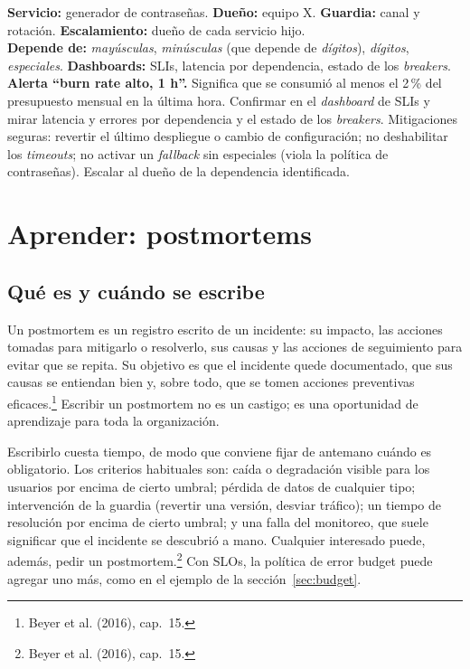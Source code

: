\documentclass[variant=apuntes,cover=institutional,mode=screen]{ua-engineering-v6-article}
\begin{document}
\begin{uainfo}
\textbf{Servicio:} generador de contraseñas. \textbf{Dueño:} equipo X. \textbf{Guardia:} canal y rotación. \textbf{Escalamiento:} dueño de cada servicio hijo.\\[2pt]
\textbf{Depende de:} \emph{mayúsculas}, \emph{minúsculas} (que depende de \emph{dígitos}), \emph{dígitos}, \emph{especiales}. \textbf{Dashboards:} SLIs, latencia por dependencia, estado de los \emph{breakers}.\\[2pt]
\textbf{Alerta ``burn rate alto, 1 h''.} Significa que se consumió al menos el 2\,\% del presupuesto mensual en la última hora. Confirmar en el \emph{dashboard} de SLIs y mirar latencia y errores por dependencia y el estado de los \emph{breakers}. Mitigaciones seguras: revertir el último despliegue o cambio de configuración; no deshabilitar los \emph{timeouts}; no activar un \emph{fallback} sin especiales (viola la política de contraseñas). Escalar al dueño de la dependencia identificada.
\end{uainfo}

\section{Aprender: postmortems}\label{sec:postmortem}

\subsection{Qué es y cuándo se escribe}

Un postmortem es un registro escrito de un incidente: su impacto, las acciones tomadas para mitigarlo o resolverlo, sus causas y las acciones de seguimiento para evitar que se repita. Su objetivo es que el incidente quede documentado, que sus causas se entiendan bien y, sobre todo, que se tomen acciones preventivas eficaces.\footnote{Beyer et al. (2016), cap.~15.} Escribir un postmortem no es un castigo; es una oportunidad de aprendizaje para toda la organización.

Escribirlo cuesta tiempo, de modo que conviene fijar de antemano cuándo es obligatorio. Los criterios habituales son: caída o degradación visible para los usuarios por encima de cierto umbral; pérdida de datos de cualquier tipo; intervención de la guardia (revertir una versión, desviar tráfico); un tiempo de resolución por encima de cierto umbral; y una falla del monitoreo, que suele significar que el incidente se descubrió a mano. Cualquier interesado puede, además, pedir un postmortem.\footnote{Beyer et al. (2016), cap.~15.} Con SLOs, la política de error budget puede agregar uno más, como en el ejemplo de la sección~\ref{sec:budget}.
\end{document}
